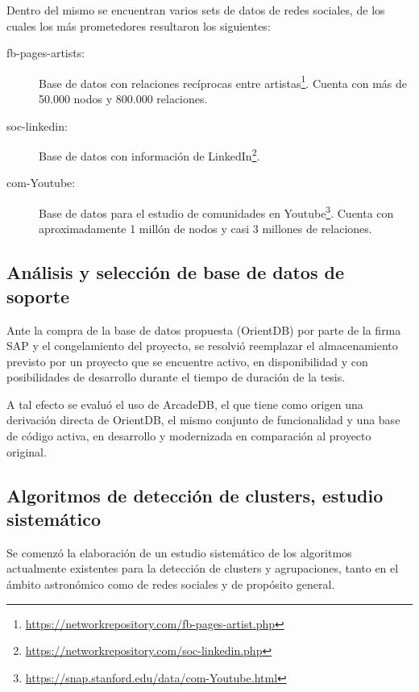 \documentclass[
	11pt,oneside,a4paper,
	fleqn,
	article
]{memoir}
\begin{document}
Dentro del mismo se encuentran varios sets de datos de redes sociales, de los cuales los más prometedores resultaron los siguientes:

\begin{description}
	\item[fb-pages-artists:] Base de datos con relaciones recíprocas entre artistas\footnote{\href{https://networkrepository.com/fb-pages-artist.php}{https://networkrepository.com/fb-pages-artist.php}}. Cuenta con más de 50.000 nodos y 800.000 relaciones.
	\item[soc-linkedin:] Base de datos con información de LinkedIn\footnote{\href{https://networkrepository.com/soc-linkedin.php}{https://networkrepository.com/soc-linkedin.php}}.
	\item[com-Youtube:] Base de datos para el estudio de comunidades en Youtube\footnote{\href{https://snap.stanford.edu/data/com-Youtube.html}{https://snap.stanford.edu/data/com-Youtube.html}}. Cuenta con aproximadamente 1 millón de nodos y casi 3 millones de relaciones\cite{yang2012defining}.
\end{description}

\subsection{Análisis y selección de base de datos de soporte}

Ante la compra de la base de datos propuesta (OrientDB) por parte de la firma SAP y el congelamiento del proyecto, se resolvió reemplazar el almacenamiento previsto por un proyecto que se encuentre activo, en disponibilidad y con posibilidades de desarrollo durante el tiempo de duración de la tesis.

A tal efecto se evaluó el uso de ArcadeDB, el que tiene como origen una derivación directa de OrientDB, el mismo conjunto de funcionalidad y una base de código activa, en desarrollo y modernizada en comparación al proyecto original\cite{ArcadeDB}.

\subsection{Algoritmos de detección de clusters, estudio sistemático}

Se comenzó la elaboración de un estudio sistemático de los algoritmos actualmente existentes para la detección de clusters y agrupaciones, tanto en el ámbito astronómico\cite{Schmeja2011} como de redes sociales y de propósito general\cite{ahmad2019survey}.
\end{document}
